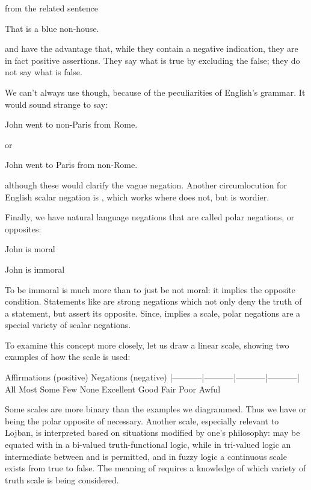 {\noindent}from the related sentence
\begin{example}
That is a blue non-house.
\end{example}

 and  have the advantage that, while they contain a negative
    indication, they are in fact positive assertions. They say what
    is true by excluding the false; they do not say what is false. 

We can't always use  though, because of the
    peculiarities of English's grammar. It would sound strange to
    say:
\begin{example}
John went to non-Paris from Rome.
\end{example}

{\noindent}or
\begin{example}
John went to Paris from non-Rome.
\end{example}

{\noindent}although these would clarify the vague negation. Another
    circumlocution for English scalar negation is ,
    which works where  does not, but is wordier. 

Finally, we have natural language negations that are called
    polar negations, or opposites:
\begin{example}
John is moral
\end{example}

\begin{example}
John is immoral
\end{example}

To be immoral is much more than to just be not moral: it
    implies the opposite condition. Statements like  are strong negations which not
    only deny the truth of a statement, but assert its opposite.
    Since,  implies a scale, polar negations are a
    special variety of scalar negations.

To examine this concept more closely, let us draw a linear
    scale, showing two examples of how the scale is used:

   Affirmations (positive)      Negations (negative)
    |-----------|-----------|-----------|-----------|
    All       Most        Some         Few       None
    Excellent Good        Fair         Poor     Awful

Some scales are more binary than the examples we diagrammed.
    Thus we have  or  being the
    polar opposite of necessary. Another scale, especially relevant
    to Lojban, is interpreted based on situations modified by one's
    philosophy:  may be equated with  in a
    bi-valued truth-functional logic, while in tri-valued logic an
    intermediate between  and  is permitted, and
    in fuzzy logic a continuous scale exists from true to false.
    The meaning of  requires a knowledge of which
    variety of truth scale is being considered.


